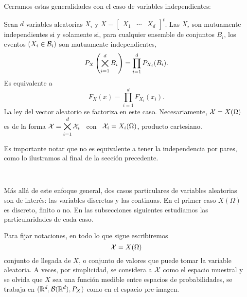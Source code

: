 Cerramos estas generalidades con el caso de variables independientes:
%
\begin{definicion}[Independencia]
\label{Def:MP:Independencia}
%
  Sean $d$  variables aleatorias  $X_i$ y  $X = \begin{bmatrix}  X_1 &  \cdots &
    X_d  \end{bmatrix}^t$.   Las  $X_i$   son  mutuamente  independientes  si  y
  solamente si,  para cualquier ensemble  de conjuntos $B_i$, los  eventos $(X_i
  \in \mathcal{B}_i)$ son mutuamente independientes, \ie
  \[
  P_X\left( \operatorname*{\bigtimes}_{i=1}^d B_i \right) = \prod_{i=1}^d P_{X_i}(B_i).
  \]
  Es equivalente a
  \[
  F_X(x) = \prod_{i=1}^d F_{X_i}(x_i).
  \]
  La ley del vector aleatorio se  factoriza en este caso.  Necesariamente, $\mathcal{X} =
  X(\Omega)$ es de  la forma $\displaystyle \mathcal{X} = \operatorname*{\bigtimes}_{i=1}^d  \mathcal{X}_i$ \ con \
  $\mathcal{X}_i = X_i(\Omega)$, producto cartesiano.
\end{definicion}
%
\noindent Es importante notar que no es equivalente a tener la independencia por
pares, como lo ilustramos al final de la secci\'on precedente.

\

M\'as  all\'a de  este  enfoque  general, dos  casos  particulares de  variables
aleatorias son  de inter\'es:  las variables discretas  y las continuas.   En el
primer  caso  $X(\Omega)$  es  discreto,  finito  o  no.   En  las  subsecciones
siguientes estudiamos las particularidades de cada caso.

Para fijar notaciones, en todo lo que sigue escribiremos
%
\[
\mathcal{X} = X(\Omega)
\]
%
conjunto de  llegada de $X$, o conjunto  de valores que puede  tomar la variable
aleatoria.   A veces,  por  simplicidad, se  considera  a $\mathcal{X}$  como el  espacio
muestral  y se  olvida  que $X$  sea  una funci\'on  medible  entre espacios  de
probabilidades, \ie se trabaja en $(\mathbb{R}^d,\mathcal{B}(\mathbb{R}^d),P_X)$ como en el espacio
pre-imagen.




\label{Ssec:MP:VADiscreta}

